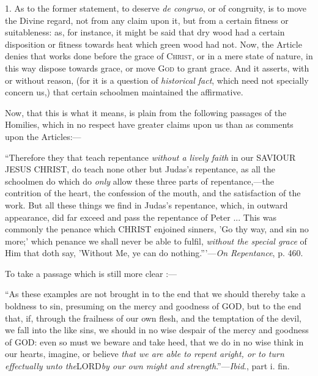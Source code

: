 1. As to the former statement, to deserve \emph{de congruo}, or of
congruity, is to move the Divine regard, not from any claim upon it,
but from a certain fitness or suitableness: as, for instance, it might
be said that dry wood had a certain disposition or fitness towards
heat which green wood had not. Now, the Article denies that works done
before the grace of C\textsc{hrist}, or in a mere state
of nature, in this way dispose towards grace, or move G\textsc{od}
to grant grace. And it asserts, with or without reason, (for it is a
question of \emph{historical fact}, which need not specially concern
us,) that certain schoolmen maintained the affirmative.

Now, that this is what it means, is plain from the following
passages of the Homilies, which in no respect have greater claims upon
us than as comments upon the Articles:—

``Therefore they that teach repentance \emph{without
a lively faith} in our SAVIOUR
JESUS CHRIST,
do teach none other but Judas's repentance, as all the schoolmen do
which do \emph{only} allow these three parts of repentance,—the
contrition of the heart, the confession of the mouth, and the
satisfaction of the work. But all these things we find in Judas's
repentance, which, in outward appearance, did far exceed and pass the
repentance of Peter ... This was commonly the penance which CHRIST
enjoined sinners, 'Go thy way, and sin no more;' which penance we
shall never be able to fulfil, \emph{without the special grace} of Him
that doth say, 'Without Me, ye can do nothing.'''—\emph{On
Repentance}, p. 460.

To take a passage which is still more clear :—

``As these examples are not brought in to the
end that we should thereby take a boldness to sin, presuming on the
mercy and goodness of GOD,
but to the end that, if, through the frailness of our own flesh, and
the temptation of the devil, we fall into the like sins, we should in
no wise despair of the mercy and goodness of GOD:
even so must we beware and take heed, that we do in no wise think in
our hearts, imagine, or believe \emph{that we are able to repent aright,
or to turn effectually unto the}LORD\emph{by our own might and strength}.''—\emph{Ibid}.,
part i. fin.

